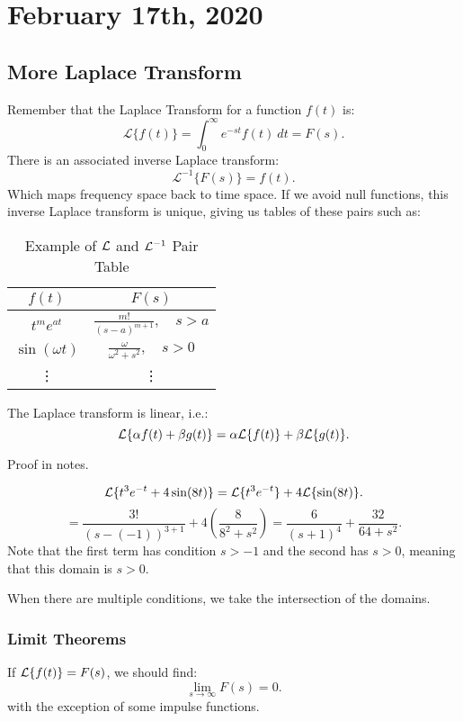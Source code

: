 \documentclass[../main/main.tex]{subfiles}
\begin{document}
\section{February 17th, 2020}
\subsection{More Laplace Transform}
Remember that the Laplace Transform for a function $f(t)$ is:
\[
	\mathcal{L}\{f(t)\} = \int^\infty_0 e^{-st}f(t)~dt = F(s)
.\] There is an associated inverse Laplace transform: \[
\mathcal{L}^{-1}\{F(s)\} = f(t)
.\] Which maps frequency space back to time space. If we avoid null functions, this inverse Laplace transform is unique, giving us tables of these pairs such as: 
\begin{table}[htpb]
	\centering
	\caption{Example of $\mathcal{L}$ and $\mathcal{L}^{-1}$ Pair Table}
	\label{tab:label}
	\begin{tabular}{c|c}
		$f(t)$ & $F(s)$\\\hline
		$t ^{m}e^{at}$ & $\frac{m!}{(s-a)^{m+1}},\quad s>a$\\
		$\sin(\omega t)$ & $\frac{\omega}{\omega^2+s^2},\quad s>0$\\
		\vdots& \vdots
	\end{tabular}
\end{table}
\begin{theorem} 
The Laplace transform is linear, i.e.: \[
	\mathcal{L}\{\alpha f(t) + \beta g(t)\} = \alpha\mathcal{L}\{f(t)\} + \beta\mathcal{L}\{g(t)\}
.\] 
\end{theorem}
\begin{remark}
	Proof in notes.
\end{remark}
\begin{example}
	 \[
		 \mathcal{L}\{t ^{3}e^{-t}+4\sin(8t)\} = \mathcal{L}\{t ^{3}e^{-t}\}+4\mathcal{L}\{\sin(8t)\} 
	.\] \[
	=\frac{3!}{(s-(-1))^{3+1}}+4\left( \frac{8}{8^2+s^2} \right) = \frac{6}{(s+1)^4}+\frac{32}{64+s^2}
.\] Note that the first term has condition $s>-1$ and the second has $s>0$, meaning that this domain is $s>0$.
\end{example}
\begin{remark}
	When there are multiple conditions, we take the intersection of the domains.
\end{remark}
\subsubsection{Limit Theorems}
\begin{theorem}
If $\mathcal{L}\{f(t)\}=F(s)$, we should find:  \[
		\lim\limits_{s \to \infty} F(s)=0
	.\] with the exception of some impulse functions.
\end{theorem}
\end{document}
